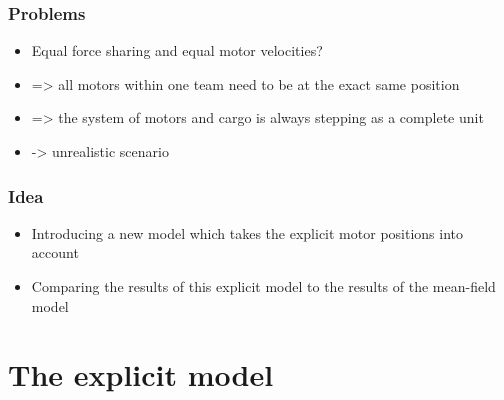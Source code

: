 \documentclass[11pt]{beamer}
\begin{document}
\begin{frame}
  \frametitle{Problems}
 \begin{itemize}
  \item 
    Equal force sharing and equal motor velocities?
    \pause
  \item
    => all motors within one team need to be at the exact same position
    \pause
  \item
    => the system of motors and cargo is always stepping as a complete unit
    \pause
  \item
    -> unrealistic scenario
 \end{itemize}
\end{frame}

\begin{frame}
  \frametitle{Idea}
  \begin{itemize}
   \item 
     Introducing a new model which takes the explicit motor positions into account
   \item
     Comparing the results of this explicit model to the results of the mean-field model
  \end{itemize}
\end{frame}


\section{The explicit model}
\end{document}
